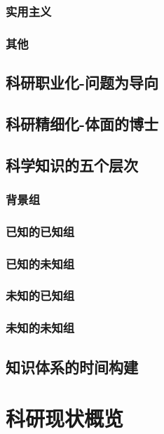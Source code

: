 \documentclass[]{book}
\begin{document}
\subsection{实用主义}

\subsection{其他}

\section{科研职业化-问题为导向}\label{-}

\section{科研精细化-体面的博士}\label{-}

\section{科学知识的五个层次}

\subsection{背景组}

\subsection{已知的已知组}

\subsection{已知的未知组}

\subsection{未知的已知组}

\subsection{未知的未知组}

\section{知识体系的时间构建}

\chapter{科研现状概览}\label{view}
\end{document}
